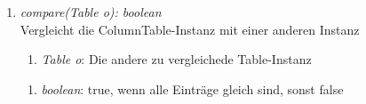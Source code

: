 \begin{enumerate}[+]
	\item \textit{compare(Table o): boolean} \\
	Vergleicht die ColumnTable-Instanz mit einer anderen Instanz
	\begin{enumerate}[$\bullet$]
		\item \textit{Table o}: Die andere zu vergleichede Table-Instanz
	\end{enumerate}
	\vspace{-0.2cm}
	\begin{enumerate}[$\circ$]
		\item \textit{boolean}: true, wenn alle Einträge gleich sind, sonst false
	\end{enumerate}
\end{enumerate}